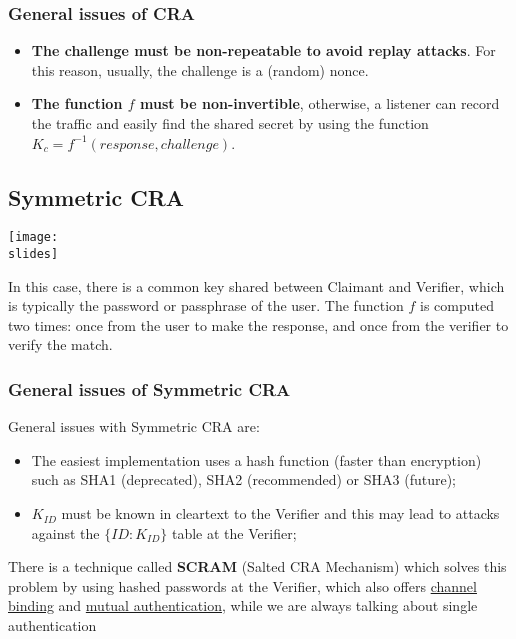 \subsubsection{General issues of CRA}
\begin{itemize}
  \item \textbf{The challenge must be non-repeatable to avoid replay attacks}. For this reason, usually, the challenge
        is a (random) nonce.
  \item \textbf{The function \(f\) must be non-invertible}, otherwise, a listener can record the traffic and easily find the
        shared secret by using the function \(K_c = f^{-1}(response, challenge)\).
\end{itemize}



\subsection{Symmetric CRA}

\noindent
\begin{minipage}{0.5\textwidth}
  \centering
  \texttt{[image: \\slides]}
\end{minipage}
\hspace{0.05\textwidth}
\begin{minipage}{0.4\textwidth}
  In this case, there is a common key
  shared between Claimant and Verifier,
  which is typically the password or
  passphrase of the user. The function \(f\) is computed two times: once from the user
  to make the response, and once from the
  verifier to verify the match.
\end{minipage}

\subsubsection{General issues of Symmetric CRA}
General issues with Symmetric CRA are:
\begin{itemize}
  \item The easiest implementation uses a hash function (faster than encryption) such as SHA1 (deprecated),
        SHA2 (recommended) or SHA3 (future);
  \item \(K_{ID}\) must be known in cleartext to the Verifier and this may lead to attacks against the \( \{ID: K_{ID}\} \) table at the Verifier;
\end{itemize}
There is a technique called \textbf{SCRAM} (Salted CRA Mechanism) which solves this problem by using hashed
passwords at the Verifier, which also offers \underline{channel binding} and \underline{mutual authentication}, while we are always talking about single authentication


